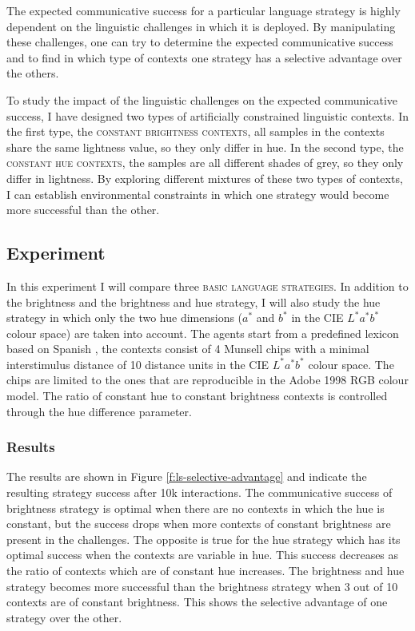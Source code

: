 The expected communicative success for a particular language strategy
is highly dependent on the linguistic challenges in which it is
deployed. By manipulating these challenges, one can try to determine
the expected communicative success and to find in which type of
contexts one strategy has a selective advantage over the others.

To study the impact of the linguistic challenges on the expected
communicative success, I have designed two types of artificially
constrained linguistic contexts. In the first type, the \textsc{constant
  brightness contexts}, all samples in the contexts share the same
lightness value, so they only differ in hue. In the second type, the
\textsc{constant hue contexts}, the samples are all different shades of
grey, so they only differ in lightness. By exploring different
mixtures of these two types of contexts, I can establish environmental
constraints in which one strategy would become more successful than
the other.

\subsection{Experiment}
\label{s:ls-selective-advantage-experiment}

In this experiment I will compare three \textsc{basic language
  strategies}. In addition to the brightness and the
brightness and hue strategy, I will also study the hue
  strategy in which only the two hue dimensions ($a^*$ and $b^*$ in
the CIE $L^*a^*b^*$ colour space) are taken into account. The agents
start from a predefined lexicon based on Spanish
\citep{lillo07locating}, the contexts consist of 4 Munsell chips
with a minimal interstimulus distance of 10 distance units in
the CIE $L^*a^*b^*$ colour space. The chips are limited to the ones
that are reproducible in the Adobe 1998 RGB colour model. The ratio
of constant hue to constant brightness contexts is controlled through
the hue difference parameter.

\subsubsection{Results}

The results are shown in Figure \ref{f:ls-selective-advantage} and
indicate the resulting strategy success after 10k interactions. The
communicative success of brightness strategy is optimal when
there are no contexts in which the hue is constant, but the success
drops when more contexts of constant brightness are present in the
challenges. The opposite is true for the hue strategy which has
its optimal success when the contexts are variable in hue. This
success decreases as the ratio of contexts which are of constant hue
increases. The brightness and hue strategy becomes more
successful than the brightness strategy when 3 out of 10
contexts are of constant brightness. This shows the selective
advantage of one strategy over the other.

